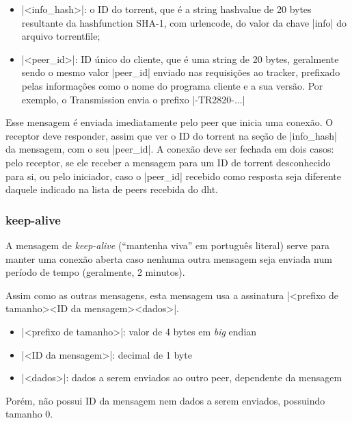 \begin{itemize}
    \item \bverb|<info\_hash>|: o ID do \gls*{torrent}, que é a \gls*{string}
        \gls*{hashvalue} de 20 bytes resultante da \gls*{hashfunction} SHA-1, com
        \gls*{urlencode}, do valor da chave \bverb|info| do arquivo \gls*{torrentfile};

    \item \bverb|<peer\_id>|: ID único do cliente, que é uma \gls*{string} de 20 bytes,
        geralmente sendo o mesmo valor \bverb|peer_id| enviado nas requisições ao
        \gls*{tracker}, prefixado pelas informações como o nome do programa cliente e a
        sua versão. Por exemplo, o Transmission envia o prefixo \sverb|-TR2820-...|
\end{itemize}

Esse mensagem é enviada imediatamente pelo \gls*{peer} que inicia uma conexão. O
receptor deve responder, assim que ver o ID do \gls*{torrent} na seção de
\bverb|info_hash| da mensagem, com o seu \bverb|peer_id|. A conexão deve ser fechada em
dois casos: pelo receptor, se ele receber a mensagem para um ID de \gls*{torrent}
desconhecido para si, ou pelo iniciador, caso o \bverb|peer_id| recebido como resposta
seja diferente daquele indicado na lista de \glspl*{peer} recebida do \gls*{dht}.

\subsubsection*{keep-alive}

A mensagem de \emph{keep-alive} (``mantenha viva'' em português literal) serve para
manter uma conexão aberta caso nenhuma outra mensagem seja enviada num período de tempo
(geralmente, 2 minutos).

Assim como as outras mensagens, esta mensagem usa a assinatura
\bverb|<prefixo de tamanho><ID da mensagem><dados>|.

\begin{itemize}
    \item \bverb|<prefixo de tamanho>|: valor de 4 bytes em \emph{big} \gls{endian}

    \item \bverb|<ID da mensagem>|: decimal de 1 byte

    \item \bverb|<dados>|: dados a serem enviados ao outro \gls*{peer}, dependente da
        mensagem
\end{itemize}

Porém, não possui ID da mensagem nem dados a serem enviados, possuindo tamanho 0.

